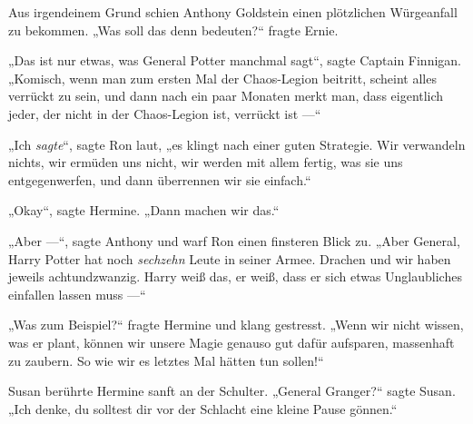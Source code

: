 Aus irgendeinem Grund schien Anthony Goldstein einen plötzlichen Würgeanfall zu bekommen.
„Was soll das denn bedeuten?“ fragte Ernie.

„Das ist nur etwas, was General Potter manchmal sagt“, sagte Captain Finnigan.
„Komisch, wenn man zum ersten Mal der Chaos-Legion beitritt, scheint alles verrückt zu sein, und dann nach ein paar Monaten merkt man, dass eigentlich jeder, der nicht in der Chaos-Legion ist, verrückt ist —“

„Ich \emph{sagte}“, sagte Ron laut, „es klingt nach einer guten Strategie. Wir verwandeln nichts, wir ermüden uns nicht, wir werden mit allem fertig, was sie uns entgegenwerfen, und dann überrennen wir sie einfach.“

„Okay“, sagte Hermine.
„Dann machen wir das.“

„Aber —“, sagte Anthony und warf Ron einen finsteren Blick zu.
„Aber General, Harry Potter hat noch \emph{sechzehn} Leute in seiner Armee. Drachen und wir haben jeweils achtundzwanzig. Harry weiß das, er weiß, dass er sich etwas Unglaubliches einfallen lassen muss —“

„Was zum Beispiel?“ fragte Hermine und klang gestresst.
„Wenn wir nicht wissen, was er plant, können wir unsere Magie genauso gut dafür aufsparen, massenhaft  zu zaubern. So wie wir es letztes Mal hätten tun sollen!“

Susan berührte Hermine sanft an der Schulter.
„General Granger?“ sagte Susan.
„Ich denke, du solltest dir vor der Schlacht eine kleine Pause gönnen.“


